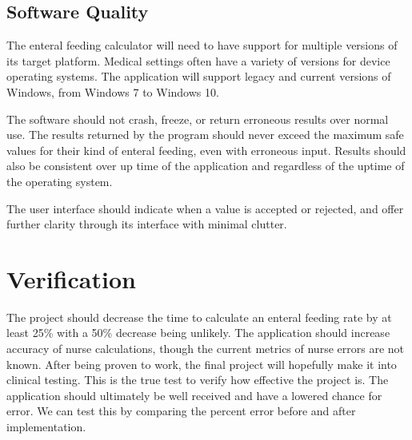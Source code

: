\documentclass[fullpage,10pt, onecolumn, draftclsnofoot]{IEEEtran}
\begin{document}
\subsection{Software Quality}
The enteral feeding calculator will need to have support for multiple versions of its target platform. Medical settings often
have a variety of versions for device operating systems.
The application will support legacy and current versions of Windows, from Windows 7 to Windows 10.

The software should not crash, freeze, or return erroneous results over normal use. The results returned by the program should never
exceed the maximum safe values for their kind of enteral feeding, even with erroneous input. Results should also be consistent over
up time of the application and regardless of the uptime of the operating system.

The user interface should indicate when a value is accepted or rejected, and offer further clarity through its interface with minimal clutter.

\section{Verification}
The project should decrease the time to calculate an enteral feeding rate by at least 25\% with a  50\% decrease being unlikely.
The application should increase accuracy of nurse calculations, though the current metrics of nurse errors are not known.
After being proven to work, the final project will hopefully make it into clinical testing. This is the true test to verify how effective the project is. The application should ultimately be well received and have a lowered chance for error. We can test this by comparing the percent error before and after implementation.
\end{document}
